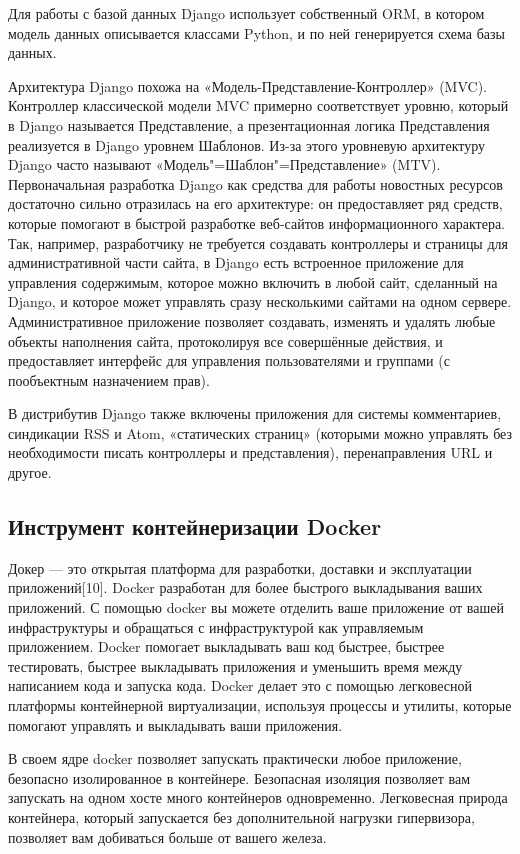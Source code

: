 Для работы с базой данных Django использует собственный ORM, в котором модель данных описывается классами Python, и по ней генерируется схема базы данных.

Архитектура Django похожа на «Модель-Представление-Контроллер» (MVC).
Контроллер классической модели MVC примерно соответствует уровню, который в Django называется Представление, а презентационная логика Представления реализуется в Django уровнем Шаблонов.
Из-за этого уровневую архитектуру Django часто называют «Модель"=Шаблон"=Представление» (MTV).
Первоначальная разработка Django как средства для работы новостных ресурсов достаточно сильно отразилась на его архитектуре: он предоставляет ряд средств, которые помогают в быстрой разработке веб-сайтов информационного характера.
Так, например, разработчику не требуется создавать контроллеры и страницы для административной части сайта, в Django есть встроенное приложение для управления содержимым, которое можно включить в любой сайт, сделанный на Django, и которое может управлять сразу несколькими сайтами на одном сервере.
Административное приложение позволяет создавать, изменять и удалять любые объекты наполнения сайта, протоколируя все совершённые действия, и предоставляет интерфейс для управления пользователями и группами (с пообъектным назначением прав).

В дистрибутив Django также включены приложения для системы комментариев, синдикации RSS и Atom, «статических страниц» (которыми можно управлять без необходимости писать контроллеры и представления), перенаправления URL и другое.

\subsection{Инструмент контейнеризации Docker}
Докер — это открытая платформа для разработки, доставки и эксплуатации приложений[10].
Docker разработан для более быстрого выкладывания ваших приложений.
С помощью docker вы можете отделить ваше приложение от вашей инфраструктуры и обращаться с инфраструктурой как управляемым приложением.
Docker помогает выкладывать ваш код быстрее, быстрее тестировать, быстрее выкладывать приложения и уменьшить время между написанием кода и запуска кода.
Docker делает это с помощью легковесной платформы контейнерной виртуализации, используя процессы и утилиты, которые помогают управлять и выкладывать ваши приложения.

В своем ядре docker позволяет запускать практически любое приложение, безопасно изолированное в контейнере.
Безопасная изоляция позволяет вам запускать на одном хосте много контейнеров одновременно.
Легковесная природа контейнера, который запускается без дополнительной нагрузки гипервизора, позволяет вам добиваться больше от вашего железа.

